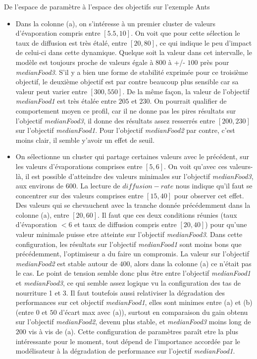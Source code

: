 \begin{testiv}{De l'espace de paramètre à l'espace des objectifs sur l'exemple Ants }{}
\begin{itemize}[nolistsep]
	\item Dans la colonne (a), on s'intéresse à un premier cluster de valeurs d'évaporation compris entre $[5.5, 10]$. On voit que pour cette sélection le taux de diffusion est très étalé, entre $[20, 80]$, ce qui indique le peu d'impact de celui-ci dans cette dynamique. Quelque soit la valeur dans cet intervalle, le modèle est toujours proche de valeurs égale à $800$ à +/- $100$ près pour \textit{medianFood3}. S'il y a bien une forme de stabilité exprimée pour ce troisième objectif, le deuxième objectif est par contre beaucoup plus sensible car sa valeur peut varier entre $[300, 550]$. De la même façon, la valeur de l'objectif \textit{medianFood1} est très étalée entre $205$ et $230$. On pourrait qualifier de comportement moyen ce profil, car il ne donne pas les pires résultats sur l'objectif \textit{medianFood3}, il donne des résultats assez resserrés entre $[200, 230]$ sur l'objectif \textit{medianFood1}. Pour l'objectif \textit{medianFood2} par contre, c'est moins clair, il semble y'avoir un effet de seuil.
	\item On sélectionne un cluster qui partage certaines valeurs avec le précédent, sur les valeurs d'évaporations comprises entre $[5, 6]$. On voit qu'avec ces valeurs-là, il est possible d'atteindre des valeurs minimales sur l'objectif \textit{medianFood3}, aux environs de $600$. La lecture de $diffusion-rate$ nous indique qu'il faut se concentrer sur des valeurs comprises entre $[15, 40]$ pour observer cet effet. Des valeurs qui se chevauchent avec la tranche donnée précédemment dans la colonne (a), entre $[20, 60]$. Il faut que ces deux conditions réunies (taux d'évaporation $< 6$ et taux de diffusion compris entre $[20, 40]$) pour qu'une valeur minimale puisse etre atteinte sur l'objectif \textit{medianFood3}. Dans cette configuration, les résultats sur l'objectif \textit{medianFood1} sont moins bons que précédemment, l'optimiseur a du faire un compromis. La valeur sur l'objectif \textit{medianFood2} est stable autour de $400$, alors dans la colonne (a) ce n'était pas le cas. Le point de tension semble donc plus être entre l'objectif \textit{medianFood1} et \textit{medianFood3}, ce qui semble assez logique vu la configuration des tas de nourriture 1 et 3. Il faut toutefois aussi relativiser la dégradation des performances sur cet objectif \textit{medianFood1}, elles sont minimes entre (a) et (b) (entre $0$ et $50$ d'écart max avec (a)), surtout en comparaison du gain obtenu sur l'objectif \textit{medianFood2}, devenu plus stable, et \textit{medianFood3} moins long de $200$ vis à vis de (a). Cette configuration de paramètres paraît etre la plus intéressante pour le moment, tout dépend de l'importance accordée par le modélisateur à la dégradation de performance sur l'ojectif \textit{medianFood1}.

\end{itemize}
\end{testiv}
